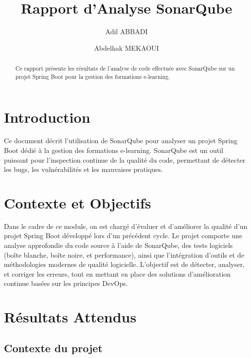 \documentclass{article}
\title{Rapport d'Analyse SonarQube}
\author{Adil ABBADI \and Abdelhak MEKAOUI}
\date{}
\begin{document}
\maketitle

\begin{abstract}
Ce rapport présente les résultats de l'analyse de code effectuée avec SonarQube sur un projet Spring Boot pour la gestion des formations e-learning.
\end{abstract}

\section{Introduction}

Ce document décrit l'utilisation de SonarQube pour analyser un projet Spring Boot dédié à la gestion des formations e-learning. SonarQube est un outil puissant pour l'inspection continue de la qualité du code, permettant de détecter les bugs, les vulnérabilités et les mauvaises pratiques.

\section{Contexte et Objectifs}

Dans le cadre de ce module, on est chargé d’évaluer et d’améliorer la qualité d’un projet Spring Boot développé lors d’un précédent cycle. Le projet comporte une analyse approfondie du code source à l'aide de SonarQube, des tests logiciels (boîte blanche, boîte noire, et performance), ainsi que l’intégration d’outils et de méthodologies modernes de qualité logicielle. L’objectif est de détecter, analyser, et corriger les erreurs, tout en mettant en place des solutions d’amélioration continue basées sur les principes DevOps.

\section{Résultats Attendus}

\subsection{Contexte du projet}
\end{document}
